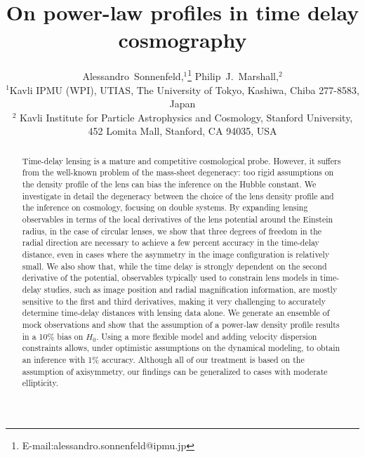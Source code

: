 \documentclass[usenatbib]{mnras}
\begin{document}
\title{On power-law profiles in time delay cosmography}
\author[Sonnenfeld \& Marshall]{
Alessandro~Sonnenfeld,$^{1}$\thanks{E-mail:alessandro.sonnenfeld@ipmu.jp}
Philip~J.~Marshall,$^{2}$
\\
$^{1}$Kavli IPMU (WPI), UTIAS, The University of Tokyo, Kashiwa, Chiba 277-8583, Japan \\
$^{2}$ Kavli Institute for Particle Astrophysics and Cosmology, Stanford University, 452 Lomita Mall, Stanford, CA 94035, USA\\
}

\maketitle

\begin{abstract}
Time-delay lensing is a mature and competitive cosmological probe.
However, it suffers from the well-known problem of the mass-sheet degeneracy:
too rigid assumptions on the density profile of the lens can bias the inference on the Hubble constant.
We investigate in detail the degeneracy between the choice of the lens density profile and the inference on cosmology, focusing on double systems.
By expanding lensing observables in terms of the local derivatives of the lens potential around the Einstein radius, in the case of circular lenses,
we show that three degrees of freedom in the radial direction are necessary to achieve a few percent accuracy in the time-delay distance, even in cases where the asymmetry in the image configuration is relatively small.
We also show that, while the time delay is strongly dependent on the second derivative of the potential, observables typically used to constrain lens models in time-delay studies, such as image position and radial magnification information, are mostly sensitive to the first and third derivatives, making it very challenging to accurately determine time-delay distances with lensing data alone.
We generate an ensemble of mock observations and show that the assumption of a power-law density profile results in a 10\% bias on $H_0$.
Using a more flexible model and adding velocity dispersion constraints allows, under optimistic assumptions on the dynamical modeling, to obtain an inference with 1\% accuracy.
Although all of our treatment is based on the assumption of axisymmetry, our findings can be generalized to cases with moderate ellipticity.
\end{abstract}
\end{document}
